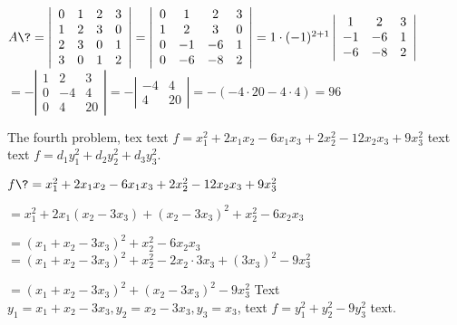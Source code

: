 \documentclass[12pt,most]{randexam}
\begin{document}
\smallskip

\begin{solution}
$A \? = \left|\begin{array}{cccc}
    0 & 1 & 2 & 3\\
    1 & 2 & 3 & 0\\
    2 & 3 & 0 & 1\\
    3 & 0 & 1 & 2
  \end{array}\right| = \left|\begin{array}{cccc}
    0 & 1 & 2 & 3\\
    1 & 2 & 3 & 0\\
    0 & - 1 & - 6 & 1\\
    0 & - 6 & - 8 & 2
  \end{array}\right| = 1 \cdot (- 1)^{2 + 1} \left|\begin{array}{ccc}
    1 & 2 & 3\\
    - 1 & - 6 & 1\\
    - 6 & - 8 & 2
  \end{array}\right|$ 
\+ $= -\left|\begin{array}{ccc}
    1 & 2 & 3\\
    0 & - 4 & 4\\
    0 & 4 & 20
  \end{array}\right| = - \left|\begin{array}{cc}
    - 4 & 4\\
    4 & 20
  \end{array}\right| = -(-4\cdot20-4\cdot4) = 96$ 
\end{solution}

\vfill

\begin{problem}
The fourth problem, tex text $f = x_1^2 + 2 x_1 x_2 - 6 x_1 x_3 + 2 x_2^2 - 12
x_2 x_3 + 9 x^2_3$ text text $f = d_1 y^2_1 + d_2 y^2_2 + d_3 y^2_3$.
\end{problem}

\smallskip

\begin{solution}
$f \? = x_1^2 + 2 x_1 x_2 - 6 x_1 x_3 + 2 x_2^2 - 12 x_2 x_3 + 9 x^2_3$ \par
  \+ $= x_1^2 + 2 x_1 (x_2 - 3 x_3) + (x_2 - 3 x_3)^2 + x_2^2 - 6 x_2 x_3 $ \par
  \+ $= (x_1 + x_2 - 3 x_3)^2 + x_2^2 - 6 x_2 x_3$ 
  \+ $= (x_1 + x_2 - 3 x_3)^2 + x_2^2 - 2 x_2 \cdot 3 x_3 + (3 x_3)^2 - 9x_3^2$ \par
  \+ $= (x_1 + x_2 - 3 x_3)^2 + (x_2 - 3 x_3)^2 - 9 x_3^2$ 
Text $y_1 = x_1 + x_2 - 3 x_3, y_2 = x_2 - 3 x_3, y_3 = x_3$, \newline
text $f = y_1^2 + y_2^2 - 9y_3^2$ text.
\end{solution}
\end{document}
